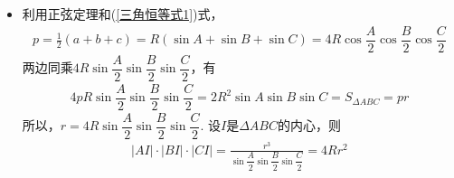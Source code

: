 \begin{itemize}[leftmargin=\inteval{\myitemleftmargin}pt,itemsep=
   \inteval{\myitemitempsep}pt,topsep=\inteval{\myitemtopsep}pt]
\begin{align*}
    \cdot(\vec{AC}-\vec{AB}) \\
    =&\ \dfrac{\rho}{|\vec{AB}|\cdot |\vec{AC}|}(
    \vec{AB}\cdot \vec{AC} |\vec{AC}|-\vec{AB}^2|\vec{AC}|+
    \vec{AC}^2|\vec{AB}|-\vec{AB}\cdot \vec{AC}|\vec{AB}|) \\
    =&\ \rho(1+\cos A)\left(|\vec{AC}|-|\vec{AB}|\right) \\
    =&\ \dfrac{r(1+\cos A)}{\sin A}
    \left(|\vec{AC}|-|\vec{AB}|\right)=
    \dfrac{r}{\tan \frac{A}{2}}
    \left(|\vec{AC}|-|\vec{AB}|\right)
\end{align*}

\item 利用正弦定理和(\ref{三角恒等式1})式，
\begin{align*}
    p=\frac{1}{2}(a+b+c)=R(\sin A+\sin B+\sin C)=4R\cos\dfrac{A}{2}
    \cos\dfrac{B}{2}\cos\dfrac{C}{2}
\end{align*}
两边同乘$ 4R\sin\dfrac{A}{2}\sin\dfrac{B}{2}\sin\dfrac{C}{2} $，有
\begin{align*}
    4pR\sin\dfrac{A}{2}\sin\dfrac{B}{2}\sin\dfrac{C}{2}=
    2R^2\sin A\sin B\sin C=S_{\Delta ABC}=pr
\end{align*}
所以，$ r=4R\sin\dfrac{A}{2}\sin\dfrac{B}{2}\sin\dfrac{C}{2} $.
设$ I $是$ \Delta ABC $的内心，则
\begin{gather*}
    |AI|\cdot|BI|\cdot|CI|=\frac{r^3}{\sin\dfrac{A}{2}\sin\dfrac{B}{2}
        \sin\dfrac{C}{2}}=4Rr^2
\end{gather*}


\end{itemize}
